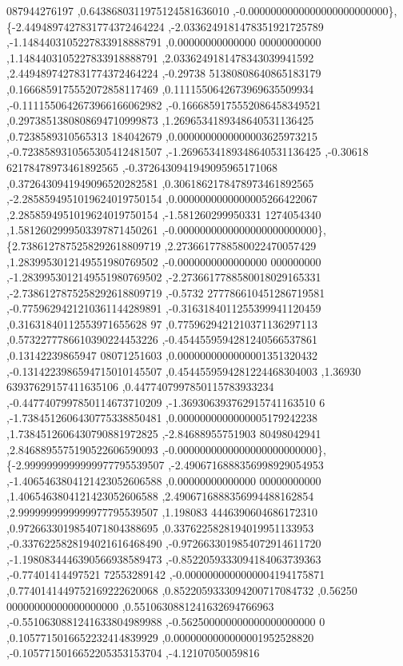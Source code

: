 \begin{DoxyCode}
      087944276197 ,0.6438680311975124581636010 ,-0.0000000000000000000000000\},
\{-2.4494897427831774372464224 ,-2.0336249181478351921725789 ,-1.1484403105227833918888791 ,0.00000000000000
      00000000000 ,1.1484403105227833918888791 ,2.0336249181478343039941592 ,2.4494897427831774372464224 ,-0.29738
      51380808640865183179 ,0.1666859175552072858117469 ,0.1111550642673969635509934 ,-0.1111550642673966166062982
       ,-0.1666859175552086458349521 ,0.2973851380808694710999873 ,1.2696534189348640531136425 ,0.7238589310565313
      184042679 ,0.0000000000000003625973215 ,-0.7238589310565305412481507 ,-1.2696534189348640531136425 ,-0.30618
      62178478973461892565 ,-0.3726430941949095965171068 ,0.3726430941949096520282581 ,0.3061862178478973461892565
       ,-2.2858594951019624019750154 ,0.0000000000000005266422067 ,2.2858594951019624019750154 ,-1.581260299950331
      1274054340 ,1.5812602999503397871450261 ,-0.0000000000000000000000000\},
\{2.7386127875258292618809719 ,2.2736617788580022470057429 ,1.2839953012149551980769502 ,-0.0000000000000000
      000000000 ,-1.2839953012149551980769502 ,-2.2736617788580018029165331 ,-2.7386127875258292618809719 ,-0.5732
      277786610451286719581 ,-0.7759629421210361144289891 ,-0.3163184011255399941120459 ,0.31631840112553971655628
      97 ,0.7759629421210371136297113 ,0.5732277786610390224453226 ,-0.4544559594281240566537861 ,0.13142239865947
      08071251603 ,0.0000000000000001351320432 ,-0.1314223986594715010145507 ,0.4544559594281224468304003 ,1.36930
      63937629157411635106 ,0.4477407997850115783933234 ,-0.4477407997850114673710209 ,-1.369306393762915741163510
      6 ,-1.7384512606430775338850481 ,0.0000000000000005179242238 ,1.7384512606430790881972825 ,-2.84688955751903
      80498042941 ,2.8468895575190522606590093 ,-0.0000000000000000000000000\},
\{-2.9999999999999977795539507 ,-2.4906716888356998929054953 ,-1.4065463804121423052606588 ,0.00000000000000
      00000000000 ,1.4065463804121423052606588 ,2.4906716888356994488162854 ,2.9999999999999977795539507 ,1.198083
      4446390604686172310 ,0.9726633019854071804388695 ,0.3376225828194019951133953 ,-0.3376225828194021616468490 
      ,-0.9726633019854072914611720 ,-1.1980834446390566938589473 ,-0.8522059333094184063739363 ,-0.77401414497521
      72553289142 ,-0.0000000000000004194175871 ,0.7740141449752169222620068 ,0.8522059333094200717084732 ,0.56250
      00000000000000000000 ,0.5510630881241632694766963 ,-0.5510630881241633804989988 ,-0.562500000000000000000000
      0 ,0.1057715016652232414839929 ,0.0000000000000001952528820 ,-0.1057715016652205353153704 ,-4.12107050059816

\end{DoxyCode}
